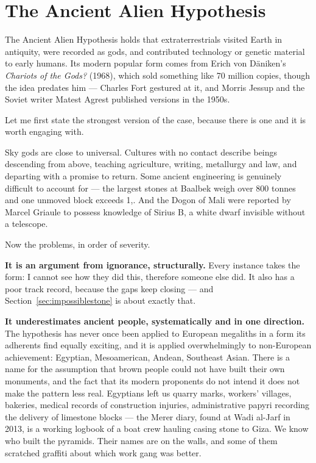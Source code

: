 \section{The Ancient Alien Hypothesis}\label{sec:aah}

The Ancient Alien Hypothesis holds that extraterrestrials visited Earth in antiquity, were
recorded as gods, and contributed technology or genetic material to early humans. Its modern
popular form comes from Erich von D\"aniken's \emph{Chariots of the Gods?} (1968), which sold
something like 70 million copies, though the idea predates him --- Charles Fort gestured at it,
and Morris Jessup and the Soviet writer Matest Agrest published versions in the 1950s.

Let me first state the strongest version of the case, because there is one and it is worth
engaging with.

Sky gods are close to universal. Cultures with no contact describe beings descending from above,
teaching agriculture, writing, metallurgy and law, and departing with a promise to return. Some
ancient engineering is genuinely difficult to account for --- the largest stones at Baalbek
weigh over 800 tonnes and one unmoved block exceeds 1,.  And the Dogon of Mali were reported by Marcel
Griaule to possess knowledge of Sirius B, a white dwarf invisible without a telescope.

Now the problems, in order of severity.

\textbf{It is an argument from ignorance, structurally.} Every instance takes the form: I cannot
see how they did this, therefore someone else did.  It also has a poor track record, because the gaps keep closing --- and
Section~\ref{sec:impossiblestone} is about exactly that.

\textbf{It underestimates ancient people, systematically and in one direction.} The
hypothesis has never once been applied to European megaliths in a form its adherents find
equally exciting, and it is applied overwhelmingly to non-European achievement: Egyptian,
Mesoamerican, Andean, Southeast Asian. There is a name for the assumption that brown people
could not have built their own monuments, and the fact that its modern proponents do not intend
it does not make the pattern less real. Egyptians left us quarry marks, workers' villages,
bakeries, medical records of construction injuries, administrative papyri recording the
delivery of limestone blocks --- the Merer diary, found at Wadi al-Jarf in 2013, is a working
logbook of a boat crew hauling casing stone to Giza. We know who built the pyramids. Their
names are on the walls, and some of them scratched graffiti about which work gang was better.

